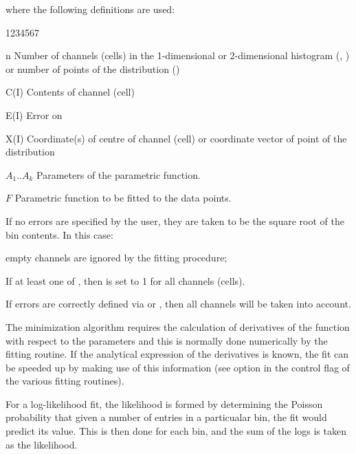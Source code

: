 where the following definitions are used:
 
\begin{DLtt}{1234567}
\item[n]    Number of channels (cells) in the 1-dimensional or 2-dimensional
            histogram (, ) or
            number of points of the distribution ()
\item[C(I)] Contents of channel (cell) 
\item[E(I)] Error on 
\item[X(I)] Coordinate(s) of centre of channel (cell)  or
            coordinate vector of point  of the distribution
\item[$A_1..A_k$] Parameters of the parametric function.
\item[$F$]  Parametric function to be fitted to the data points.
\end{DLtt}
 
\Remarks
\begin{UL}
\item If no errors are specified by the user,
      they are taken to be the square root of the bin contents.
      In this case:
      \begin{UL}
      \item empty channels are ignored by the fitting procedure;
      \item If at least one of , then  is
            set to 1 for all channels (cells).
      \end{UL}
\item If errors are correctly defined via  or ,
      then all channels will be taken into account.
\end{UL}
 
The minimization algorithm requires the calculation of derivatives of
the function with respect to the parameters and this is normally done
numerically by the fitting routine. If the analytical expression of the
derivatives is known, the fit can be speeded up by making use of this
information (see option  in the control flag of the
various fitting routines).
 
For a log-likelihood fit, the likelihood 
is formed by determining the Poisson
probability that given a number of entries in a particualar bin,
the fit would predict its value.  This is then done for each bin,
and the sum of the logs is taken as the likelihood.

